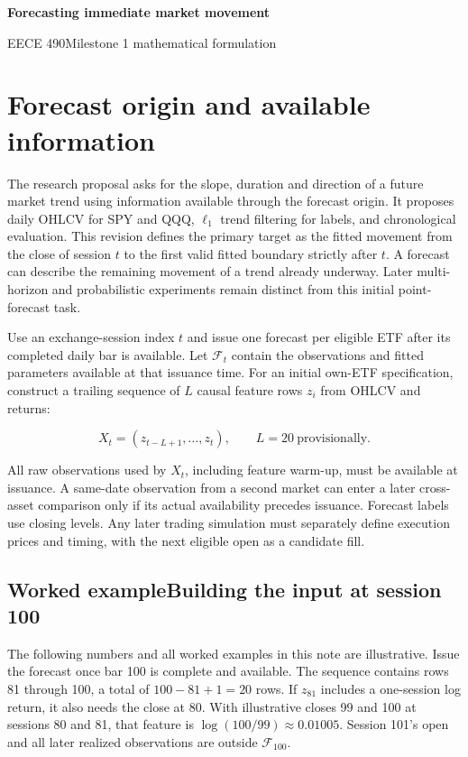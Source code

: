 \documentclass[10pt,letterpaper]{article}
\begin{document}
{\huge\bfseries Forecasting immediate market movement\par}

{\large EECE 490\quad Milestone 1 mathematical formulation\par}\vspace{9pt}

\section{Forecast origin and available information}

The research proposal asks for the slope, duration and direction of a future market trend using information available through the forecast origin. It proposes daily OHLCV for SPY and QQQ, \(\ell_1\) trend filtering for labels, and chronological evaluation. This revision defines the primary target as the fitted movement from the close of session \(t\) to the first valid fitted boundary strictly after \(t\). A forecast can describe the remaining movement of a trend already underway. Later multi-horizon and probabilistic experiments remain distinct from this initial point-forecast task.\par

Use an exchange-session index \(t\) and issue one forecast per eligible ETF after its completed daily bar is available. Let \(\mathcal F_t\) contain the observations and fitted parameters available at that issuance time. For an initial own-ETF specification, construct a trailing sequence of \(L\) causal feature rows \(z_i\) from OHLCV and returns:\par

\[
X_t=(z_{t-L+1},\ldots,z_t),\qquad L=20\ \text{provisionally}.
\]

All raw observations used by \(X_t\), including feature warm-up, must be available at issuance. A same-date observation from a second market can enter a later cross-asset comparison only if its actual availability precedes issuance. Forecast labels use closing levels. Any later trading simulation must separately define execution prices and timing, with the next eligible open as a candidate fill.\par

\subsection*{Worked example\quad Building the input at session 100}

The following numbers and all worked examples in this note are illustrative. Issue the forecast once bar 100 is complete and available. The sequence contains rows 81 through 100, a total of \(100-81+1=20\) rows. If \(z_{81}\) includes a one-session log return, it also needs the close at 80. With illustrative closes 99 and 100 at sessions 80 and 81, that feature is \(\log(100/99)\approx0.01005\). Session 101's open and all later realized observations are outside \(\mathcal F_{100}\).\par
\end{document}
